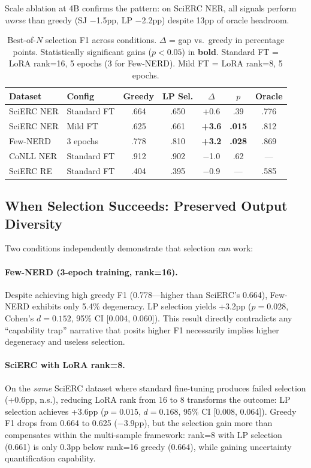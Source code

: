 \documentclass[11pt,a4paper]{article}
\begin{document}
Scale ablation at 4B confirms the pattern: on SciERC NER, all signals perform \emph{worse} than greedy (SJ $-$1.5pp, LP $-$2.2pp) despite 13pp of oracle headroom.

\begin{table}[t]
\centering
\small
\caption{Best-of-$N$ selection F1 across conditions. $\Delta$ = gap vs.\ greedy in percentage points. Statistically significant gains ($p<0.05$) in \textbf{bold}. Standard FT = LoRA rank=16, 5 epochs (3 for Few-NERD). Mild FT = LoRA rank=8, 5 epochs.}
\label{tab:selection}
\begin{tabular}{llccccc}
\toprule
\textbf{Dataset} & \textbf{Config} & \textbf{Greedy} & \textbf{LP Sel.} & \textbf{$\Delta$} & \textbf{$p$} & \textbf{Oracle} \\
\midrule
SciERC NER  & Standard FT & .664 & .650 & +0.6  & .39  & .776 \\
SciERC NER  & Mild FT     & .625 & .661 & \textbf{+3.6}  & \textbf{.015} & .812 \\
Few-NERD    & 3 epochs    & .778 & .810 & \textbf{+3.2}  & \textbf{.028} & .869 \\
CoNLL NER   & Standard FT & .912 & .902 & $-$1.0 & .62  & --- \\
\midrule
SciERC RE   & Standard FT & .404 & .395 & $-$0.9 & ---  & .585 \\
\bottomrule
\end{tabular}
\end{table}

\subsection{When Selection Succeeds: Preserved Output Diversity}

Two conditions independently demonstrate that selection \emph{can} work:

\paragraph{Few-NERD (3-epoch training, rank=16).}
Despite achieving high greedy F1 (0.778---higher than SciERC's 0.664), Few-NERD exhibits only 5.4\% degeneracy.
LP selection yields +3.2pp ($p{=}0.028$, Cohen's $d{=}0.152$, 95\% CI [0.004, 0.060]).
This result directly contradicts any ``capability trap'' narrative that posits higher F1 necessarily implies higher degeneracy and useless selection.

\paragraph{SciERC with LoRA rank=8.}
On the \emph{same} SciERC dataset where standard fine-tuning produces failed selection (+0.6pp, n.s.), reducing LoRA rank from 16 to 8 transforms the outcome: LP selection achieves +3.6pp ($p{=}0.015$, $d{=}0.168$, 95\% CI [0.008, 0.064]).
Greedy F1 drops from 0.664 to 0.625 ($-$3.9pp), but the selection gain more than compensates within the multi-sample framework: rank=8 with LP selection (0.661) is only 0.3pp below rank=16 greedy (0.664), while gaining uncertainty quantification capability.
\end{document}
